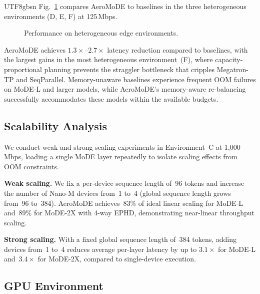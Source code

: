 \documentclass[conference]{IEEEtran}
\begin{document}
\begin{CJK*}{UTF8}{gbsn}
Fig.~\ref{fig:hetero} compares AeroMoDE to baselines in the three
heterogeneous environments (D, E, F) at 125\,Mbps.

\begin{figure}[t]
  \centering
  \caption{Performance on heterogeneous edge environments.}
  \label{fig:hetero}
\end{figure}

AeroMoDE achieves $1.3\times$--$2.7\times$ latency reduction
compared to baselines, with the largest gains in the most
heterogeneous environment~(F), where capacity-proportional planning
prevents the straggler bottleneck that cripples Megatron-TP and
SeqParallel.  Memory-unaware baselines experience frequent OOM
failures on MoDE-L and larger models, while AeroMoDE's memory-aware
re-balancing successfully accommodates these models within the
available budgets.

\subsection{Scalability Analysis}
\label{sec:scalability}

We conduct weak and strong scaling experiments in Environment~C
at 1,000\,Mbps, loading a single MoDE layer repeatedly to isolate
scaling effects from OOM constraints.

\textbf{Weak scaling.}  We fix a per-device sequence length of~96
tokens and increase the number of Nano-M devices from~1 to~4 (global
sequence length grows from~96 to~384).  AeroMoDE achieves~83\% of
ideal linear scaling for MoDE-L and~89\% for MoDE-2X with 4-way
EPHD, demonstrating near-linear throughput scaling.

\textbf{Strong scaling.}  With a fixed global sequence length of~384
tokens, adding devices from~1 to~4 reduces average per-layer latency
by up to $3.1\times$ for MoDE-L and~$3.4\times$ for MoDE-2X,
compared to single-device execution.

\subsection{GPU Environment}
\label{sec:gpu}


\end{CJK*}
\end{document}
